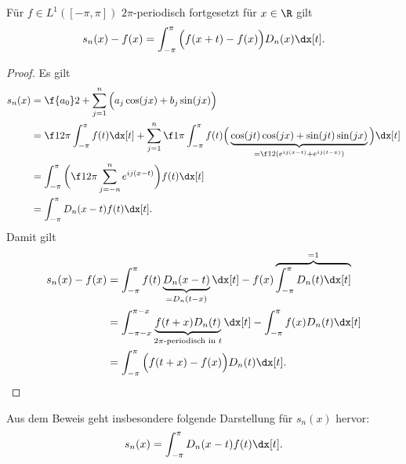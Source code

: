 \begin{lem} \label{3.26}
	Für $f \in L^1([-\pi, \pi])$ $2\pi$-periodisch fortgesetzt für $x\in \R$ gilt
	\begin{align*}
		s_n(x) - f(x) = \int_{-\pi}^{\pi} \Big(f(x+t) - f(x)\Big) D_n(x) \dx[t].
	\end{align*}
	\begin{proof}
		Es gilt
		\begin{align*}
			s_n(x) 
			&= \f {a_0}2 + \sum_{j=1}^n \Big( a_j \cos(jx) + b_j \sin(jx) \Big) \\
			&= \f 1{2 \pi} \int_{-\pi}^{\pi} f(t) \dx[t] + \sum_{j=1}^n \f 1{\pi} \int_{-\pi}^{\pi} f(t) \Big( \underbrace{\cos(jt) \cos(jx) + \sin(jt) \sin(jx)}_{= \f 12 ( e^{ij(x-t)} + e^{ij(t-x)})} \Big) \dx[t] \\
			&= \int_{-\pi}^{\pi} \bigg( \f 1{2\pi} \sum_{j=-n}^n e^{ij(x-t)} \bigg) f(t) \dx[t] \\
			&= \int_{-\pi}^{\pi} D_n(x-t) f(t) \dx[t].
		\end{align*}
		Damit gilt
		\begin{align*}
			s_n(x) - f(x) 
			&= \int_{-\pi}^{\pi} f(t) \underbrace{D_n(x-t)}_{=D_n(t-x)} \dx[t] - f(x) \overbrace{\int_{-\pi}^{\pi} D_n(t) \dx[t]}^{=1} \\
			&= \int_{-\pi-x}^{\pi-x} \underbrace{f(t + x)D_n(t)}_{\text{$2\pi$-periodisch in $t$}} \dx[t] - \int_{-\pi}^\pi f(x) D_n(t) \dx[t] \\
			&= \int_{-\pi}^{\pi} \Big( f(t + x) - f(x) \Big) D_n(t) \dx[t].
		\end{align*}
	\end{proof}
	\begin{note}
		Aus dem Beweis geht insbesondere folgende Darstellung für $s_n(x)$ hervor:
		\begin{align*}
			s_n(x) = \int_{-\pi}^{\pi} D_n(x-t) f(t) \dx[t].
		\end{align*}
	\end{note}
\end{lem}

